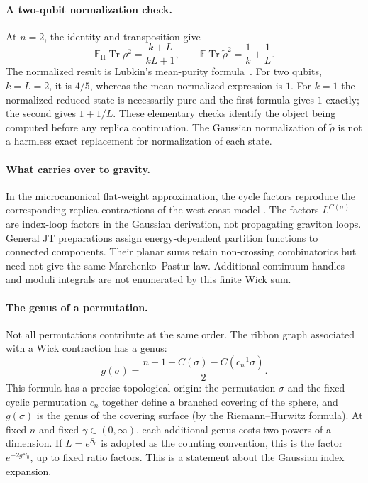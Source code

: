 \documentclass[11pt,letterpaper]{article}
\theoremstyle{plain}
\theoremstyle{definition}
\theoremstyle{remark}
\begin{document}
\paragraph{A two-qubit normalization check.}
At $n=2$, the identity and transposition give
\begin{equation}
 \mathbb E_{\mathrm H}\operatorname{Tr}\rho^2
 =\frac{k+L}{kL+1},\qquad
 \mathbb E\operatorname{Tr}\widetilde\rho^2=\frac1k+\frac1L.
 \label{eq06:exact_purity}
\end{equation}
The normalized result is Lubkin's mean-purity formula~\citep{lubkin1978}.
For two qubits, $k=L=2$, it is $4/5$, whereas the mean-normalized expression
is $1$.  For $k=1$ the normalized reduced state is necessarily pure and the
first formula gives $1$ exactly; the second gives $1+1/L$.  These elementary
checks identify the object being computed before any replica continuation.
The Gaussian normalization of $\widetilde\rho$ is not a harmless exact
replacement for normalization of each state.

\paragraph{What carries over to gravity.}
In the microcanonical flat-weight approximation, the cycle factors reproduce
the corresponding replica contractions of the west-coast model
\citep{pssyetal2022}.  The factors $L^{C(\sigma)}$ are index-loop factors
in the Gaussian derivation, not propagating graviton loops.  General JT
preparations assign energy-dependent partition functions to connected
components.  Their planar sums retain non-crossing combinatorics but need
not give the same Marchenko--Pastur law.  Additional continuum handles and
moduli integrals are not enumerated by this finite Wick sum.

\paragraph{The genus of a permutation.}
Not all permutations contribute at the same order.  The ribbon graph associated with a Wick contraction has a genus:
\begin{equation}
\label{eq06:genus_formula}
g(\sigma) = \frac{n + 1 - C(\sigma) - C(c_n^{-1}\sigma)}{2}.
\end{equation}
This formula has a precise topological origin: the permutation $\sigma$
and the fixed cyclic permutation $c_n$ together define a branched covering
of the sphere, and $g(\sigma)$ is the genus of the covering surface (by the
Riemann--Hurwitz formula).  At fixed $n$ and fixed $\gamma\in(0,\infty)$, each additional genus
costs two powers of a dimension.  If $L=e^{S_0}$ is adopted as the counting
convention, this is the factor $e^{-2gS_0}$, up to fixed ratio factors.
This is a statement about the Gaussian index expansion.
\end{document}
